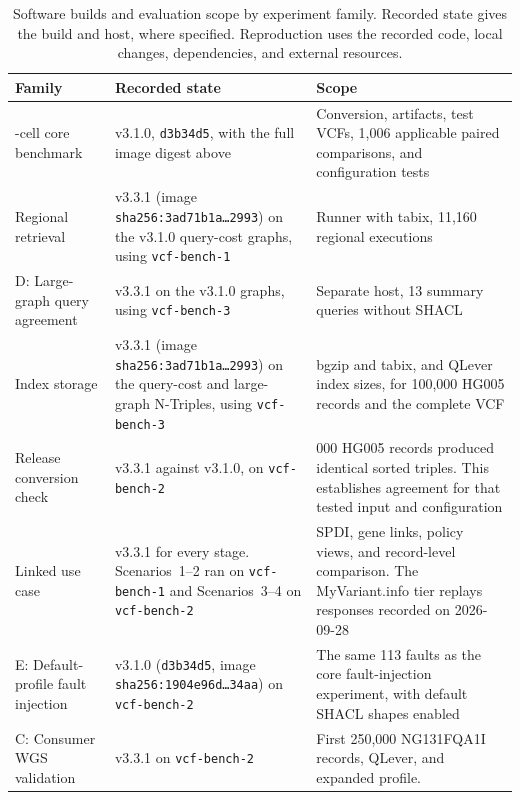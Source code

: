 \documentclass[11pt]{article}
\newcommand{\rowsep}{\noalign{\vskip2pt{\color{black!22}\hrule height 0.4pt}\vskip2pt}}%
\begin{document}
\begin{table}[!htbp]
\caption{Software builds and evaluation scope by experiment family.
Recorded state gives the build and host, where specified.
Reproduction uses the recorded code, local changes, dependencies, and external resources.}\label{tab:builds}%
\centering\footnotesize\setlength{\tabcolsep}{4pt}\renewcommand{\arraystretch}{1.1}\renewcommand{\tabularxcolumn}[1]{m{#1}}%
\begin{tabularx}{\textwidth}{@{}>{\raggedright\arraybackslash}m{}>{\raggedright\arraybackslash}m{}>{\raggedright\arraybackslash}X@{}}
\toprule
\textbf{Family} & \textbf{Recorded state} & \textbf{Scope}\\
\midrule
143-cell core benchmark & v3.1.0, \texttt{d3b34d5}, with the full image digest above & Conversion, artifacts, test VCFs, 1,006 applicable paired comparisons, and configuration tests\\
\rowsep
Regional retrieval & v3.3.1 (image \texttt{sha256:3ad71b1a\ldots2993}) on the v3.1.0 query-cost graphs, using \texttt{vcf-bench-1} & Runner with tabix, 11{,}160 regional executions\\
\rowsep
D: Large-graph query agreement & v3.3.1 on the v3.1.0 graphs, using \texttt{vcf-bench-3} & Separate host, 13 summary queries without SHACL\\
\rowsep
Index storage & v3.3.1 (image \texttt{sha256:3ad71b1a\ldots2993}) on the query-cost and large-graph N-Triples, using \texttt{vcf-bench-3} & bgzip and tabix, and QLever index sizes, for 100{,}000 HG005 records and the complete VCF\\
\rowsep
Release conversion check & v3.3.1 against v3.1.0, on \texttt{vcf-bench-2} & 100{,}000 HG005 records produced identical sorted triples.
This establishes agreement for that tested input and configuration\\
\rowsep
Linked use case & v3.3.1 for every stage.
Scenarios~1--2 ran on \texttt{vcf-bench-1} and Scenarios~3--4 on \texttt{vcf-bench-2} & SPDI, gene links, policy views, and record-level comparison.
The MyVariant.info tier replays responses recorded on 2026-09-28\\
\rowsep
E: Default-profile fault injection & v3.1.0 (\texttt{d3b34d5}, image \texttt{sha256:1904e96d\ldots34aa}) on \texttt{vcf-bench-2} & The same 113 faults as the core fault-injection experiment, with default SHACL shapes enabled\\
\rowsep
C: Consumer WGS validation & v3.3.1 on \texttt{vcf-bench-2} & First 250,000 NG131FQA1I records, QLever, and expanded profile.

\end{tabularx}
\end{table}
\end{document}
